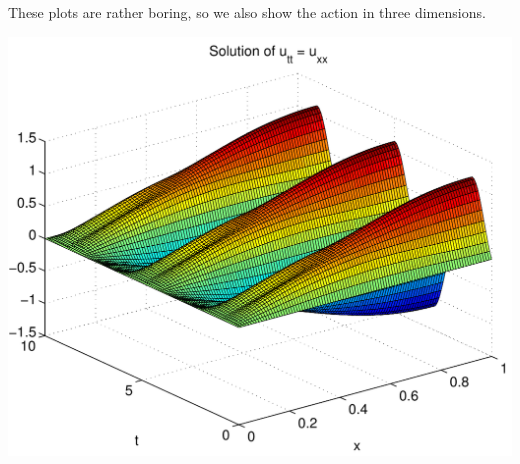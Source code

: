 {\begin{solution}
\begin{enumerate}
These plots are rather boring, so we also show the action in three dimensions.

\begin{center}
   \includegraphics[scale=0.55]{mixed_3d}
\end{center}
\end{enumerate}


\end{solution}}{}

